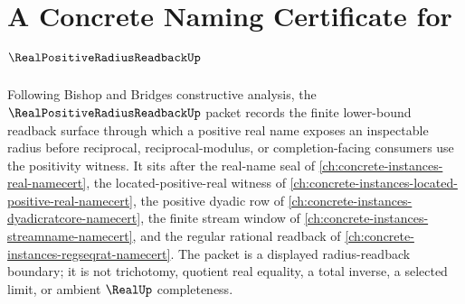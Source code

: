 \chapter{A Concrete Naming Certificate for $\RealPositiveRadiusReadbackUp$}
\label{ch:concrete-instances-real-positive-radius-readback-namecert}

Following Bishop and Bridges constructive analysis, the $\RealPositiveRadiusReadbackUp$ packet records the finite lower-bound readback surface through which a positive real name exposes an inspectable radius before reciprocal, reciprocal-modulus, or completion-facing consumers use the positivity witness. It sits after the real-name seal of \autoref{ch:concrete-instances-real-namecert}, the located-positive-real witness of \autoref{ch:concrete-instances-located-positive-real-namecert}, the positive dyadic row of \autoref{ch:concrete-instances-dyadicratcore-namecert}, the finite stream window of \autoref{ch:concrete-instances-streamname-namecert}, and the regular rational readback of \autoref{ch:concrete-instances-regseqrat-namecert}. The packet is a displayed radius-readback boundary; it is not trichotomy, quotient real equality, a total inverse, a selected limit, or ambient $\RealUp$ completeness.

